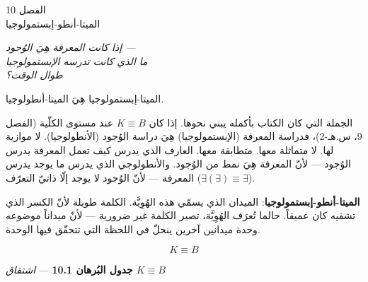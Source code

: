\documentclass[10pt, openany, oneside]{book}
\renewcommand{\large}{\fontsize{11.5}{14}\selectfont}
\renewcommand{\huge}{\fontsize{17}{21}\selectfont}
\begin{document}
%
%
%

\newpage

\begin{center}
    {\huge الفصل 10}\\[0.3em]
    {\large الميتا-أنطو-إبستمولوجيا}
\end{center}

\vspace{1.5em}

\begin{center}
    \itshape
    إذا كانت المعرفة هِيَ الوُجود ---\\
    ما الذي كانت تدرسه الإبستمولوجيا\\
    طوال الوقت؟
\end{center}

\vspace{2em}


\noindent الميتا-إبستمولوجيا هِيَ الميتا-أنطولوجيا.

الجملة التي كان الكتاب بأكمله يبني نحوها. إذا كان $K \equiv B$ عند مستوى الكلّية (الفصل 9، س.هـ-2)، فدراسة المعرفة (الإبستمولوجيا) هِيَ دراسة الوُجود (الأنطولوجيا). لا موازية لها. لا متماثلة معها. متطابقة معها. العارف الذي يدرس كيف تعمل المعرفة يدرس الوُجود --- لأنّ المعرفة هِيَ نمط من الوُجود. والأنطولوجي الذي يدرس ما يوجد يدرس المعرفة --- لأنّ الوُجود لا يوجد إلّا ذاتيّ التعرّف ($\exists(\exists) \equiv \exists$).

\textbf{الميتا-أنطو-إبستمولوجيا}: الميدان الذي يسمّي هذه الهُوِيَّة. الكلمة طويلة لأنّ الكسر الذي تشفيه كان عميقاً. حالما تُعرَف الهُوِيَّة، تصير الكلمة غير ضرورية --- لأنّ ميداناً موضوعه وحدة ميدانين آخرين ينحلّ في اللحظة التي تتحقّق فيها الوحدة.

$$\boxed{K \equiv B}$$

\vspace{0.5em}

\textbf{جدول البُرهان 10.1} --- \textit{اشتقاق $K \equiv B$}

\vspace{0.5em}
\end{document}

